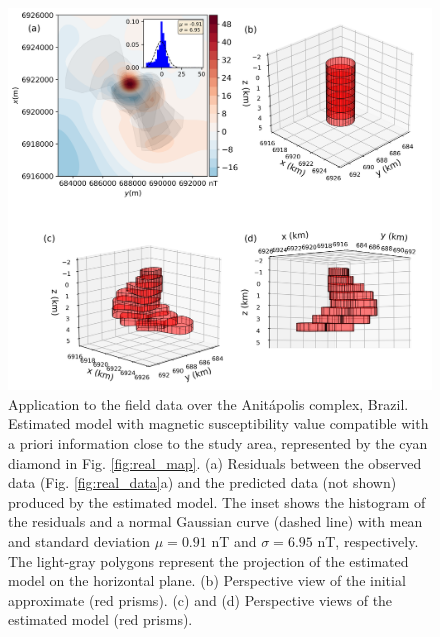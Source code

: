 \begin{figure}
    \centering
    \includegraphics[width=\linewidth]{figures/real_results_cyan_diamond.png}
    \caption{Application to the field data over the Anit{\'a}polis complex, Brazil.
    Estimated model with magnetic susceptibility value compatible with 
    a priori information close to the study area, 
    represented by the cyan diamond in Fig. \ref{fig:real_map}. 
    (a) Residuals between the observed data (Fig. \ref{fig:real_data}a) and the 
    predicted data (not shown) produced by the estimated model. 
    The inset shows the histogram of the residuals and a normal 
    Gaussian curve (dashed line) with mean and standard deviation 
    $\mu = 0.91$ nT and $\sigma = 6.95$ nT, respectively.
    The light-gray polygons represent the projection of the estimated 
    model on the horizontal plane. 
    (b) Perspective view of the initial approximate (red prisms). 
    (c) and (d) Perspective views of the estimated model (red prisms).}
    \label{fig:real_result}
\end{figure}